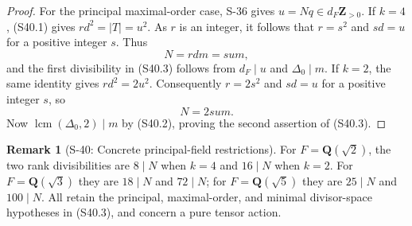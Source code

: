 \documentclass[11pt,a4paper]{article}
\theoremstyle{definition}
\newtheorem{remark}[theorem]{Remark}
\begin{document}
\begin{proof}
For the principal maximal-order case, S-36 gives
$u=Nq\in d_F\mathbf Z_{>0}$. If $k=4$, (S40.1) gives
$rd^2=|T|=u^2$. As $r$ is an integer, it follows that
$r=s^2$ and $sd=u$ for a positive integer $s$. Thus
\[
 N=rdm=s u m,
\]
and the first divisibility in (S40.3) follows from
$d_F\mid u$ and $\Delta_0\mid m$.
If $k=2$, the same identity gives $rd^2=2u^2$.
Consequently $r=2s^2$ and $sd=u$ for a positive integer $s$,
so
\[
 N=2s u m.
\]
Now $\operatorname{lcm}(\Delta_0,2)\mid m$ by (S40.2), proving
the second assertion of (S40.3).
\end{proof}

\begin{remark}[S-40: Concrete principal-field restrictions]
For $F=\mathbf Q(\sqrt2)$, the two rank divisibilities are
$8\mid N$ when $k=4$ and $16\mid N$ when $k=2$.
For $F=\mathbf Q(\sqrt3)$ they are $18\mid N$ and $72\mid N$;
for $F=\mathbf Q(\sqrt5)$ they are $25\mid N$ and $100\mid N$.
All retain the principal, maximal-order, and minimal divisor-space
hypotheses in (S40.3), and concern a pure tensor action.
\end{remark}
\end{document}
